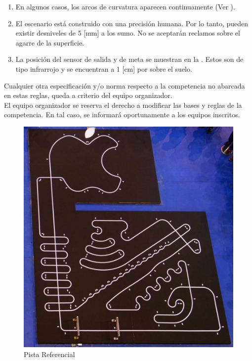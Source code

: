 \begin{enumerate}
  \item En algunos casos, los arcos de curvatura aparecen continuamente (Ver ).

  \item El escenario está construido con una precisión humana. Por lo tanto, pueden existir desniveles de 5 [mm] a los sumo. No se aceptarán reclamos sobre el agarre de la superficie.

  \item La posición del sensor de salida y de meta se muestran en la . Estos son de tipo infrarrojo y se encuentran a 1 [cm] por sobre el suelo.
\end{enumerate}

\vspace{15mm}
Cualquier otra especificación y/o norma respecto a la competencia no abarcada en estas reglas, queda a criterio del equipo organizador. \\

El equipo organizador se reserva el derecho a modificar las bases y reglas de la competencia. En tal caso, se informará oportunamente a los equipos inscritos.

\begin{figure}[H]
  \centering
  \includegraphics[width=\linewidth]{./images/rules/figure1.png}
  \caption{Pista Referencial}
\end{figure}

